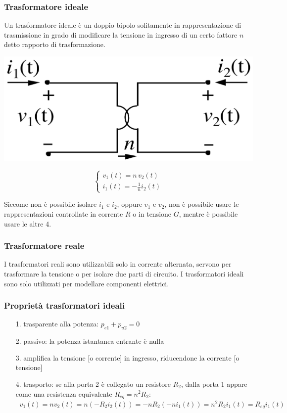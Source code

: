 \documentclass[a4paper]{article}
\begin{document}
\subsubsection*{Trasformatore ideale}
Un trasformatore ideale è un doppio bipolo solitamente in rappresentazione di trasmissione in grado di modificare la tensione
in ingresso di un certo fattore \(n\) detto rapporto di trasformazione.

\begin{center}
	\begin{minipage}{0.3\textwidth}
		\centering
		\includegraphics[width=\textwidth]{trasformatore.png}
	\end{minipage}
	\begin{minipage}{0.4\textwidth}
		\[\begin{cases}
			\displaystyle v_1(t) = n \, v_2(t) \\[7pt]
			\displaystyle i_1(t) = -\frac{1}{n} i_2(t)
		\end{cases}\]
	\end{minipage}
\end{center}
Siccome non è possibile isolare \(i_1\) e \(i_2\), oppure \(v_1\) e \(v_2\), non è possibile usare le rappresentazioni controllate
in corrente \(R\) o in tensione \(G\), mentre è possibile usare le altre 4.

\subsubsection*{Trasformatore reale}
I trasformatori reali sono utilizzabili solo in corrente alternata, servono per trasformare la tensione o per isolare due parti
di circuito. I trasformatori ideali sono solo utilizzati per modellare componenti elettrici.

\subsubsection*{Proprietà trasformatori ideali}
\begin{itemize}
	\item[1.] trasparente alla potenza: \(p_{e1} + p_{u2} = 0\)
	\item[2.] passivo: la potenza istantanea entrante è nulla
	\item[3.] amplifica la tensione [o corrente] in ingresso, riducendone la corrente [o tensione]
	\item[4.] trasporto: se alla porta 2 è collegato un resistore \(R_2\), dalla porta 1 appare come una resistenza equivalente
	\(R_{eq} = n^2 R_2\): \(\;\;v_1(t) = n v_2(t) = n (-R_2 i_2(t)) = - n R_2(-n i_1(t)) = n^2 R_2 i_1(t) = R_{eq} i_1(t)\)
\end{itemize}
\end{document}
